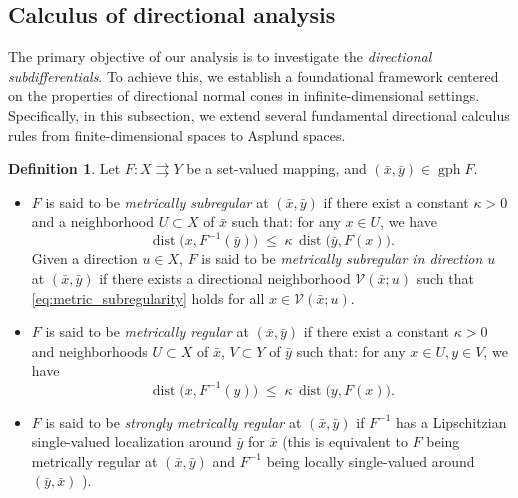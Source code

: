 \documentclass[12pt,twoside,reqno]{amsart}
\theoremstyle{definition}
\newtheorem{definition}[theorem]{Definition}
\numberwithin{equation}{section}
\begin{document}
\subsection{Calculus of directional analysis}\label{subsec for preliminary directional results}

The primary objective of our analysis is to investigate the \emph{directional subdifferentials}.  
To achieve this, we establish a foundational framework centered on the properties of directional normal cones in infinite-dimensional settings. 
Specifically, in this subsection, we extend several fundamental directional calculus rules from finite-dimensional spaces to Asplund spaces. 

\begin{definition}
Let \( F : X \rightrightarrows Y \) be a set-valued mapping, and \( (\bar{x}, \bar{y}) \in \operatorname{gph} F \).
\begin{itemize}
    \item[(i)] \( F \) is said to be \emph{metrically subregular} at \( (\bar{x}, \bar{y}) \) if there exist a constant \( \kappa > 0 \) and a neighborhood \( U \subset X \) of \( \bar{x} \) such that: for any $x \in U$, we have 
    \begin{equation}\label{eq:metric_subregularity}
        \operatorname{dist}\bigl(x, F^{-1}(\bar{y})\bigr)
        \;\le\;
        \kappa\, \operatorname{dist}\bigl(\bar{y}, F(x)\bigr).
    \end{equation}
     Given a direction $u \in X$, $F$ is said to be \emph{metrically subregular in direction $u$} at $(\bar{x}, \bar{y})$ if there exists a directional neighborhood $\mathcal{V}(\bar x; u)$ such that \eqref{eq:metric_subregularity} holds for all $x \in \mathcal{V}(\bar{x};u)$.

\item[(ii)] 
\( F \) is said to be \emph{metrically regular} at \( (\bar{x}, \bar{y}) \) if there exist a constant \( \kappa > 0 \) and neighborhoods \( U \subset X \) of \( \bar{x} \), $V\subset Y$ of $\bar y$ such that: for any $x \in U,y\in V$, we have 
    \begin{equation}\label{eq:metric_regularity}
        \operatorname{dist}\bigl(x, F^{-1}(y)\bigr)
        \;\le\;
        \kappa\, \operatorname{dist}\bigl(y, F(x)\bigr).
    \end{equation}

\item[(iii)] 
\( F \) is said to be \emph{strongly metrically regular} at \( (\bar{x}, \bar{y}) \) if $F^{-1}$ has a Lipschitzian single-valued localization around $\bar y$ for $\bar x$ (this is equivalent to $F$ being metrically regular at $(\bar{x}, \bar{y})$ and $F^{-1}$ being locally single-valued around $(\bar{y}, \bar{x})$ \cite[Proposition~3G.1]{dontchev2009implicit}).   

\end{itemize}
\end{definition}
\end{document}
